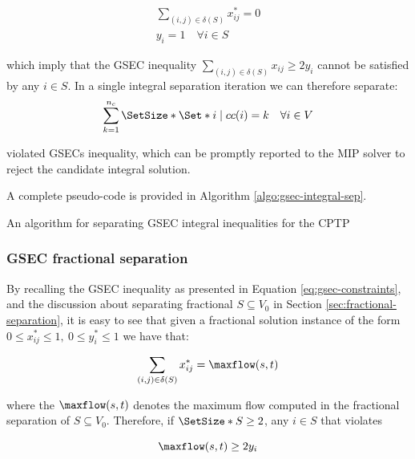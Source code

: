 \begin{align}
	\sum_{(i, j) \in \delta(S)} x^*_{ij} = 0 \\
	y_i =  1 \quad \forall i \in S
\end{align}

which imply that the GSEC inequality $\sum_{(i, j) \in \delta(S)} x_{ij} \ge 2 y_i$ cannot be satisfied by any $i \in S$.
In a single integral separation iteration we can therefore separate:
\begin{equation}
	\sum^{n_c}_{k = 1} \SetSize*{ \Set*{ i \mid cc(i) = k \quad \forall i \in V } }
\end{equation}

violated GSECs inequality, which can be promptly reported to the MIP solver to reject the candidate integral solution.

A complete pseudo-code is provided in Algorithm \ref{algo:gsec-integral-sep}.

\begin{algorithm}
	\caption{An algorithm for separating GSEC integral inequalities for the CPTP}
	\label{algo:gsec-integral-sep}
	
\end{algorithm}

\subsubsection{GSEC fractional separation}
\label{sec:impl-gsec-fractional-separation}

By recalling the GSEC inequality as presented in Equation \eqref{eq:gsec-constraints}, and the discussion about separating fractional $S \subseteq V_0$ in Section \ref{sec:fractional-separation}, it is easy to see that given a fractional solution instance of the form $0 \le x^*_{ij} \le 1,\ 0 \le y^*_{i} \le 1$ we have that:

\begin{equation}
	\sum_{(i, j) \in \delta(S)} x^*_{ij} = \maxflow(s, t)
\end{equation}

where the $\maxflow(s, t)$ denotes the maximum flow computed in the fractional separation of $S \subseteq V_0$.
Therefore, if $\SetSize*{S} \ge 2$, any $i \in S$ that violates

\begin{equation}
	\maxflow(s, t) \ge 2 y_i
\end{equation}

